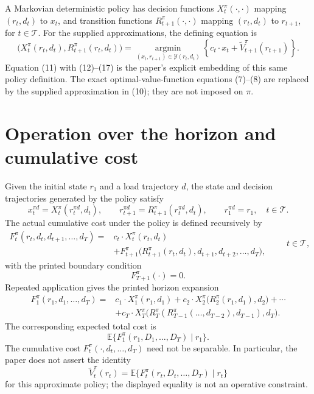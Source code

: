 \documentclass{article}
\begin{document}
A Markovian deterministic policy has decision functions $X_t^\pi(\cdot,\cdot)$ mapping $(r_t,d_t)$ to $x_t$, and transition functions $R_{t+1}^\pi(\cdot,\cdot)$ mapping $(r_t,d_t)$ to $r_{t+1}$, for $t\in\mathcal T$. For the supplied approximations, the defining equation is
\begin{equation}
\bigl(X_t^\pi(r_t,d_t),R_{t+1}^\pi(r_t,d_t)\bigr)
=\operatorname*{argmin}_{(x_t,r_{t+1})\in\mathcal Y(r_t,d_t)}
\left\{c_t\cdot x_t+\tilde V^\pi_{t+1}(r_{t+1})\right\}.
\tag{10}
\end{equation}
Equation (11) with (12)--(17) is the paper's explicit embedding of this same policy definition. The exact optimal-value-function equations (7)--(8) are replaced by the supplied approximation in (10); they are not imposed on $\pi$.

\section*{Operation over the horizon and cumulative cost}

Given the initial state $r_1$ and a load trajectory $d$, the state and decision trajectories generated by the policy satisfy
\begin{equation}
x_t^{\pi d}=X_t^\pi(r_t^{\pi d},d_t),\qquad
r_{t+1}^{\pi d}=R_{t+1}^\pi(r_t^{\pi d},d_t),\qquad
r_1^{\pi d}=r_1,
\quad t\in\mathcal T.
\tag{18}
\end{equation}
The actual cumulative cost under the policy is defined recursively by
\begin{equation}
\begin{aligned}
F_t^\pi(r_t,d_t,d_{t+1},\ldots,d_T)
={}&c_t\cdot X_t^\pi(r_t,d_t)\\
&+F_{t+1}^\pi\bigl(R_{t+1}^\pi(r_t,d_t),d_{t+1},d_{t+2},\ldots,d_T\bigr),
\end{aligned}
\qquad t\in\mathcal T,
\tag{5}
\end{equation}
with the printed boundary condition
\[
F_{T+1}^\pi(\cdot)=0.
\]
Repeated application gives the printed horizon expansion
\begin{equation}
\begin{aligned}
F_1^\pi(r_1,d_1,\ldots,d_T)
={}&c_1\cdot X_1^\pi(r_1,d_1)
+c_2\cdot X_2^\pi\bigl(R_2^\pi(r_1,d_1),d_2\bigr)+\cdots\\
&+c_T\cdot X_T^\pi\bigl(R_T^\pi(R_{T-1}^\pi(\ldots,d_{T-2}),d_{T-1}),d_T\bigr).
\end{aligned}
\tag{6}
\end{equation}
The corresponding expected total cost is
\[
\mathbb E\bigl\{F_1^\pi(r_1,D_1,\ldots,D_T)\mid r_1\bigr\}.
\]
The cumulative cost $F_t^\pi(\cdot,d_t,\ldots,d_T)$ need not be separable. In particular, the paper does not assert the identity
\[
\tilde V_t^\pi(r_t)
=\mathbb E\bigl\{F_t^\pi(r_t,D_t,\ldots,D_T)\mid r_t\bigr\}
\]
for this approximate policy; the displayed equality is not an operative constraint.
\end{document}
